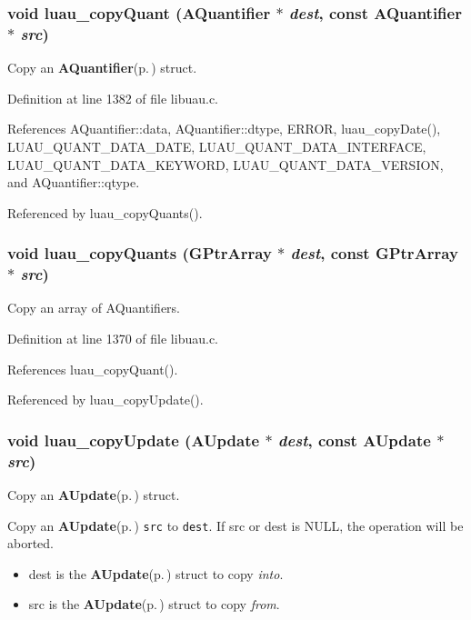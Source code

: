 \subsubsection{\setlength{\rightskip}{0pt plus 5cm}void luau\_\-copy\-Quant ({\bf AQuantifier} $\ast$ {\em dest}, const {\bf AQuantifier} $\ast$ {\em src})}\label{libuau_8h_a94}


Copy an {\bf AQuantifier}{\rm (p.\,\pageref{structAQuantifier})} struct. 



Definition at line 1382 of file libuau.c.

References AQuantifier::data, AQuantifier::dtype, ERROR, luau\_\-copy\-Date(), LUAU\_\-QUANT\_\-DATA\_\-DATE, LUAU\_\-QUANT\_\-DATA\_\-INTERFACE, LUAU\_\-QUANT\_\-DATA\_\-KEYWORD, LUAU\_\-QUANT\_\-DATA\_\-VERSION, and AQuantifier::qtype.

Referenced by luau\_\-copy\-Quants().
\subsubsection{\setlength{\rightskip}{0pt plus 5cm}void luau\_\-copy\-Quants (GPtr\-Array $\ast$ {\em dest}, const GPtr\-Array $\ast$ {\em src})}\label{libuau_8h_a93}


Copy an array of AQuantifiers. 



Definition at line 1370 of file libuau.c.

References luau\_\-copy\-Quant().

Referenced by luau\_\-copy\-Update().
\subsubsection{\setlength{\rightskip}{0pt plus 5cm}void luau\_\-copy\-Update ({\bf AUpdate} $\ast$ {\em dest}, const {\bf AUpdate} $\ast$ {\em src})}\label{libuau_8h_a88}


Copy an {\bf AUpdate}{\rm (p.\,\pageref{structAUpdate})} struct. 

Copy an {\bf AUpdate}{\rm (p.\,\pageref{structAUpdate})} {\tt src} to {\tt dest}. If src or dest is NULL, the operation will be aborted.

\begin{itemize}
\item dest is the {\bf AUpdate}{\rm (p.\,\pageref{structAUpdate})} struct to copy {\em into\/}. \item src is the {\bf AUpdate}{\rm (p.\,\pageref{structAUpdate})} struct to copy {\em from\/}. \end{itemize}


